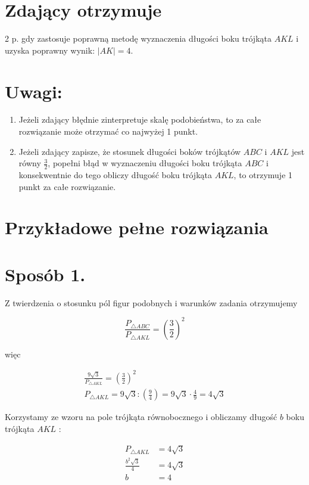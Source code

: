 \documentclass[10pt]{article}
\begin{document}
\section*{Zdający otrzymuje}
 2 p. gdy zastosuje poprawną metodę wyznaczenia długości boku trójkąta $A K L$ i uzyska poprawny wynik: $|A K|=4$.\section*{Uwagi:}
\begin{enumerate}
  \item Jeżeli zdający błędnie zinterpretuje skalę podobieństwa, to za całe rozwiązanie może otrzymać co najwyżej 1 punkt.
  \item Jeżeli zdający zapisze, że stosunek długości boków trójkątów $A B C$ i $A K L$ jest równy $\frac{3}{2}$, popełni błąd w wyznaczeniu długości boku trójkąta $A B C$ i konsekwentnie do tego obliczy długość boku trójkąta $A K L$, to otrzymuje 1 punkt za całe rozwiązanie.
\end{enumerate}

\section*{Przykładowe pełne rozwiązania}
\section*{Sposób 1.}
Z twierdzenia o stosunku pól figur podobnych i warunków zadania otrzymujemy

$$
\frac{P_{\triangle A B C}}{P_{\triangle A K L}}=\left(\frac{3}{2}\right)^{2}
$$

więc

$$
\begin{gathered}
\frac{9 \sqrt{3}}{P_{\triangle A K L}}=\left(\frac{3}{2}\right)^{2} \\
P_{\triangle A K L}=9 \sqrt{3}:\left(\frac{9}{4}\right)=9 \sqrt{3} \cdot \frac{4}{9}=4 \sqrt{3}
\end{gathered}
$$

Korzystamy ze wzoru na pole trójkąta równobocznego i obliczamy długość $b$ boku trójkąta $A K L$ :

$$
\begin{aligned}
P_{\triangle A K L} & =4 \sqrt{3} \\
\frac{b^{2} \sqrt{3}}{4} & =4 \sqrt{3} \\
b & =4
\end{aligned}
$$
\end{document}
